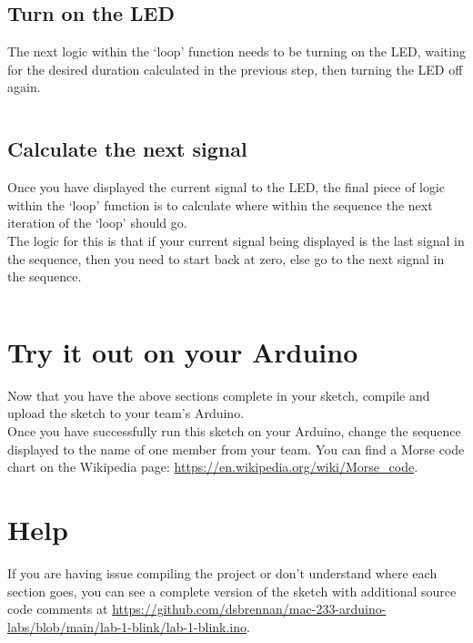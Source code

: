 \documentclass[11pt,a4paper]{article}
\begin{document}
\inputminted{arduino}{./src/3-calculate-duration.txt}

\subsection{Turn on the LED}
\label{sec:led}
The next logic within the `loop' function needs to be turning on the LED, waiting for the desired duration calculated in the previous step, then turning the LED off again.

\inputminted{arduino}{./src/4-flash-led.txt}

\subsection{Calculate the next signal}
\label{sec:next}
Once you have displayed the current signal to the LED, the final piece of logic within the `loop' function is to calculate where within the sequence the next iteration of the `loop' should go.\\

\noindent
The logic for this is that if your current signal being displayed is the last signal in the sequence, then you need to start back at zero, else go to the next signal in the sequence.

\inputminted{arduino}{./src/5-next-sequence.txt}

\section{Try it out on your Arduino}
Now that you have the above sections complete in your sketch, compile and upload the sketch to your team's Arduino.\\ 

\noindent
Once you have successfully run this sketch on your Arduino, change the sequence displayed to the name of one member from your team. You can find a Morse code chart on the Wikipedia page: \url{https://en.wikipedia.org/wiki/Morse_code}.

\section*{Help}
If you are having issue compiling the project or don't understand where each section goes, you can see a complete version of the sketch with additional source code comments at \url{https://github.com/dsbrennan/mac-233-arduino-labs/blob/main/lab-1-blink/lab-1-blink.ino}.

\vspace{2em}

\begin{center}
\end{center}
\end{document}
